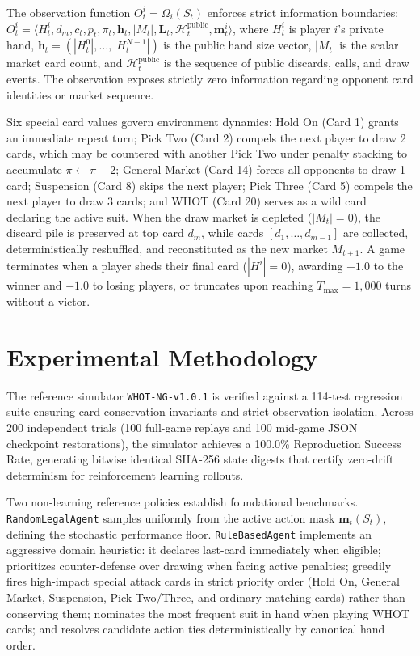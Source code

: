 \documentclass[journal]{IEEEtran}
\begin{document}
The observation function $O_t^i = \Omega_i(S_t)$ enforces strict information boundaries: $O_t^i = \langle H_t^i, d_m, c_t, p_t, \pi_t, \mathbf{h}_t, |M_t|, \mathbf{L}_t, \mathcal{H}_t^{\text{public}}, \mathbf{m}_t^i \rangle$, where $H_t^i$ is player $i$'s private hand, $\mathbf{h}_t = (|H_t^0|, \dots, |H_t^{N-1}|)$ is the public hand size vector, $|M_t|$ is the scalar market card count, and $\mathcal{H}_t^{\text{public}}$ is the sequence of public discards, calls, and draw events. The observation exposes strictly zero information regarding opponent card identities or market sequence.

Six special card values govern environment dynamics: Hold On (Card 1) grants an immediate repeat turn; Pick Two (Card 2) compels the next player to draw 2 cards, which may be countered with another Pick Two under penalty stacking to accumulate $\pi \leftarrow \pi + 2$; General Market (Card 14) forces all opponents to draw 1 card; Suspension (Card 8) skips the next player; Pick Three (Card 5) compels the next player to draw 3 cards; and WHOT (Card 20) serves as a wild card declaring the active suit. When the draw market is depleted ($|M_t| = 0$), the discard pile is preserved at top card $d_m$, while cards $[d_1, \dots, d_{m-1}]$ are collected, deterministically reshuffled, and reconstituted as the new market $M_{t+1}$. A game terminates when a player sheds their final card ($|H^i|=0$), awarding $+1.0$ to the winner and $-1.0$ to losing players, or truncates upon reaching $T_{\max} = 1{,}000$ turns without a victor.

\section{Experimental Methodology}
The reference simulator \texttt{WHOT-NG-v1.0.1} is verified against a 114-test regression suite ensuring card conservation invariants and strict observation isolation. Across 200 independent trials (100 full-game replays and 100 mid-game JSON checkpoint restorations), the simulator achieves a 100.0\% Reproduction Success Rate, generating bitwise identical SHA-256 state digests that certify zero-drift determinism for reinforcement learning rollouts.

Two non-learning reference policies establish foundational benchmarks. \texttt{RandomLegalAgent} samples uniformly from the active action mask $\mathbf{m}_t(S_t)$, defining the stochastic performance floor. \texttt{RuleBasedAgent} implements an aggressive domain heuristic: it declares last-card immediately when eligible; prioritizes counter-defense over drawing when facing active penalties; greedily fires high-impact special attack cards in strict priority order (Hold On, General Market, Suspension, Pick Two/Three, and ordinary matching cards) rather than conserving them; nominates the most frequent suit in hand when playing WHOT cards; and resolves candidate action ties deterministically by canonical hand order.
\end{document}
